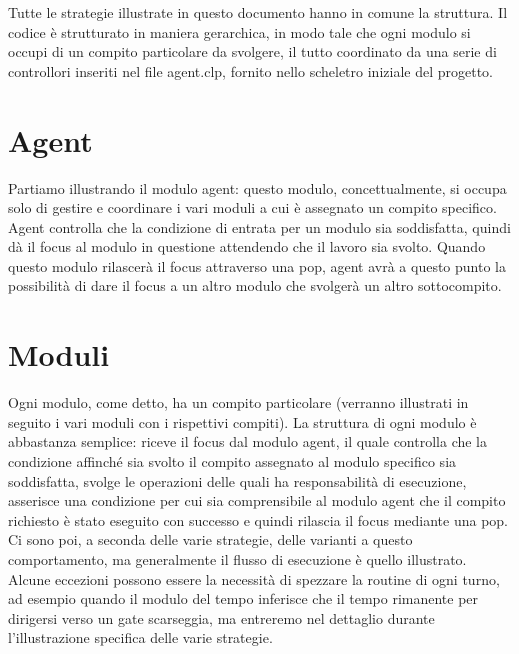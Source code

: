 Tutte le strategie illustrate in questo documento hanno in comune la struttura.
Il codice è strutturato in maniera gerarchica, in modo tale che ogni modulo si occupi di un compito particolare da svolgere, il tutto coordinato da una serie di controllori inseriti nel file {\color{red}agent.clp}, fornito nello scheletro iniziale del progetto.
\section{Agent} \label{sec:agent}
Partiamo illustrando il modulo agent: questo modulo, concettualmente, si occupa solo di gestire e coordinare i vari moduli a cui è assegnato un compito specifico. Agent controlla che la condizione di entrata per un modulo sia soddisfatta, quindi dà il focus al modulo in questione attendendo che il lavoro sia svolto. Quando questo modulo rilascerà il focus attraverso una pop, agent avrà a questo punto la possibilità di dare il focus a un altro modulo che svolgerà un altro sottocompito.

\section{Moduli} \label{sec:moduli}
Ogni modulo, come detto, ha un compito particolare (verranno illustrati in seguito i vari moduli con i rispettivi compiti). La struttura di ogni modulo è abbastanza semplice: riceve il focus dal modulo agent, il quale controlla che la condizione affinché sia svolto il compito assegnato al modulo specifico sia soddisfatta, svolge le operazioni delle quali ha responsabilità di esecuzione, asserisce una condizione per cui sia comprensibile al modulo agent che il compito richiesto è stato eseguito con successo e quindi rilascia il focus mediante una pop.
Ci sono poi, a seconda delle varie strategie, delle varianti a questo comportamento, ma generalmente il flusso di esecuzione è quello illustrato. Alcune eccezioni possono essere la necessità di spezzare la routine di ogni turno, ad esempio quando il modulo del tempo inferisce che il tempo rimanente per dirigersi verso un gate scarseggia, ma entreremo nel dettaglio durante l'illustrazione specifica delle varie strategie.

